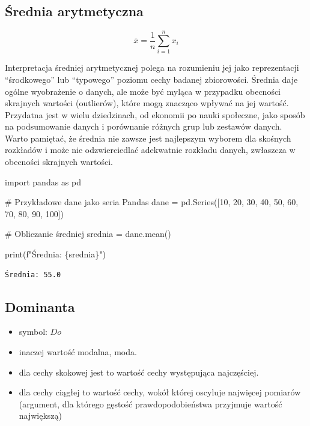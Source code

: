 \documentclass[
  polish,
  letterpaper,
  DIV=11,
  numbers=noendperiod]{scrreprt}
\newenvironment{Shaded}{\begin{snugshade}}{\end{snugshade}}
\newcommand{\BuiltInTok}[1]{\textcolor[rgb]{0.00,0.23,0.31}{#1}}
\newcommand{\CommentTok}[1]{\textcolor[rgb]{0.37,0.37,0.37}{#1}}
\newcommand{\DecValTok}[1]{\textcolor[rgb]{0.68,0.00,0.00}{#1}}
\newcommand{\ImportTok}[1]{\textcolor[rgb]{0.00,0.46,0.62}{#1}}
\newcommand{\NormalTok}[1]{\textcolor[rgb]{0.00,0.23,0.31}{#1}}
\newcommand{\OperatorTok}[1]{\textcolor[rgb]{0.37,0.37,0.37}{#1}}
\newcommand{\SpecialCharTok}[1]{\textcolor[rgb]{0.37,0.37,0.37}{#1}}
\newcommand{\SpecialStringTok}[1]{\textcolor[rgb]{0.13,0.47,0.30}{#1}}
\providecommand{\tightlist}{%
  \setlength{\itemsep}{0pt}\setlength{\parskip}{0pt}}
\begin{document}
\subsection{Średnia arytmetyczna}\label{ux15brednia-arytmetyczna}

\[\overline{x} = \frac{1}{n} \sum_{i=1}^n x_i\]

Interpretacja średniej arytmetycznej polega na rozumieniu jej jako
reprezentacji ``środkowego'' lub ``typowego'' poziomu cechy badanej
zbiorowości. Średnia daje ogólne wyobrażenie o danych, ale może być
myląca w przypadku obecności skrajnych wartości (outlierów), które mogą
znacząco wpływać na jej wartość. Przydatna jest w wielu dziedzinach, od
ekonomii po nauki społeczne, jako sposób na podsumowanie danych i
porównanie różnych grup lub zestawów danych. Warto pamiętać, że średnia
nie zawsze jest najlepszym wyborem dla skośnych rozkładów i może nie
odzwierciedlać adekwatnie rozkładu danych, zwłaszcza w obecności
skrajnych wartości.

\begin{Shaded}
\begin{Highlighting}[]
\ImportTok{import}\NormalTok{ pandas }\ImportTok{as}\NormalTok{ pd}

\CommentTok{\# Przykładowe dane jako seria Pandas}
\NormalTok{dane }\OperatorTok{=}\NormalTok{ pd.Series([}\DecValTok{10}\NormalTok{, }\DecValTok{20}\NormalTok{, }\DecValTok{30}\NormalTok{, }\DecValTok{40}\NormalTok{, }\DecValTok{50}\NormalTok{, }\DecValTok{60}\NormalTok{, }\DecValTok{70}\NormalTok{, }\DecValTok{80}\NormalTok{, }\DecValTok{90}\NormalTok{, }\DecValTok{100}\NormalTok{])}

\CommentTok{\# Obliczanie średniej}
\NormalTok{srednia }\OperatorTok{=}\NormalTok{ dane.mean()}

\BuiltInTok{print}\NormalTok{(}\SpecialStringTok{f"Średnia: }\SpecialCharTok{\{}\NormalTok{srednia}\SpecialCharTok{\}}\SpecialStringTok{"}\NormalTok{)}
\end{Highlighting}
\end{Shaded}

\begin{verbatim}
Średnia: 55.0
\end{verbatim}

\subsection{Dominanta}\label{dominanta}

\begin{itemize}
\tightlist
\item
  symbol: \(Do\)
\item
  inaczej wartość modalna, moda.
\item
  dla cechy skokowej jest to wartość cechy występująca najczęściej.
\item
  dla cechy ciągłej to wartość cechy, wokół której oscyluje najwięcej
  pomiarów (argument, dla którego gęstość prawdopodobieństwa przyjmuje
  wartość największą)
\end{itemize}
\end{document}
